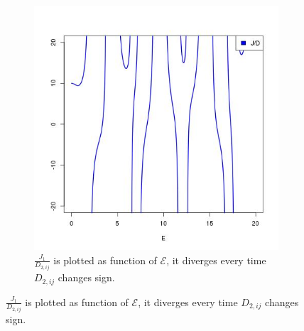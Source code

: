 \begin{figure}
\begin{subfigure}{.5\textwidth}
  \includegraphics[width=1\linewidth]{Chapters/ratio.jpg}
  \caption{$\frac{J_{1}}{D_{2,ij}}$ is plotted as function of $\mathcal{E}$, it diverges every time $D_{2,ij}$ changes sign.}
  \label{Fig1:ratio}
\end{subfigure}
\label{Fig1}
\end{figure}




